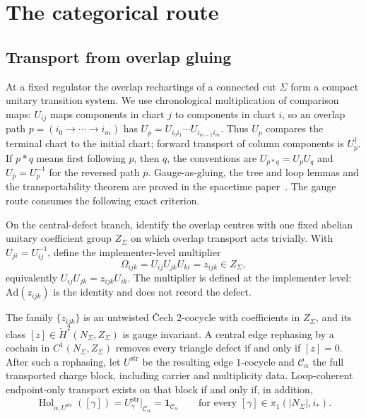 \documentclass[11pt]{article}
\begin{document}
\section{The categorical route}
\label{sec:categorical-route}

\subsection{Transport from overlap gluing}

At a fixed regulator the overlap rechartings of a connected cut \(\Sigma\)
form a compact unitary transition system. We use chronological multiplication
of comparison maps: \(U_{ij}\) maps components in chart \(j\) to components
in chart \(i\), so an overlap path \(p=(i_0\to\cdots\to i_m)\) has
\(U_p=U_{i_0i_1}\cdots U_{i_{m-1}i_m}\). Thus \(U_p\) compares the terminal
chart to the initial chart; forward transport of column components is
\(U_p^\dagger\). If \(p\ast q\) means first following \(p\), then \(q\),
the conventions are \(U_{p\ast q}=U_pU_q\) and
\(U_{\overline p}=U_p^{-1}\) for the reversed path \(\overline p\).
Gauge-as-gluing, the tree and loop
lemmas and the transportability theorem are proved in the spacetime
paper~\cite{ophEinstein}. The gauge route consumes the following exact
criterion.

On the central-defect branch, identify the overlap centres with one fixed
abelian unitary coefficient group \(Z_\Sigma\) on which overlap transport acts
trivially. With \(U_{ji}=U_{ij}^{-1}\), define the implementer-level
multiplier
\[
\Omega_{ijk}=U_{ij}U_{jk}U_{ki}=z_{ijk}\in Z_\Sigma,
\]
equivalently \(U_{ij}U_{jk}=z_{ijk}U_{ik}\). The multiplier is defined at the
implementer level: \(\mathrm{Ad}(z_{ijk})\) is the identity and does not
record the defect.

\begin{theorem}
\label{thm:central-defect-strictification}
The family \(\{z_{ijk}\}\) is an untwisted \v{C}ech 2-cocycle with
coefficients in \(Z_\Sigma\), and its class
\([z]\in\check H^2(N_\Sigma,Z_\Sigma)\) is gauge invariant. A central edge
rephasing by a cochain in \(C^1(N_\Sigma,Z_\Sigma)\) removes every triangle
defect if and only if \([z]=0\). After such a rephasing, let
\(U^{\mathrm{str}}\) be the resulting edge \(1\)-cocycle and
\(\mathcal C_\alpha\) the full transported charge block, including carrier
and multiplicity data. Loop-coherent endpoint-only transport exists on that
block if and only if, in addition,
\[
\operatorname{Hol}_{\alpha,U^{\mathrm{str}}}([\gamma])
=U^{\mathrm{str}}_\gamma\big|_{\mathcal C_\alpha}
=\mathbf 1_{\mathcal C_\alpha}
\qquad
\text{for every }[\gamma]\in\pi_1(|N_\Sigma|,i_*).
\]
\end{theorem}
\end{document}
